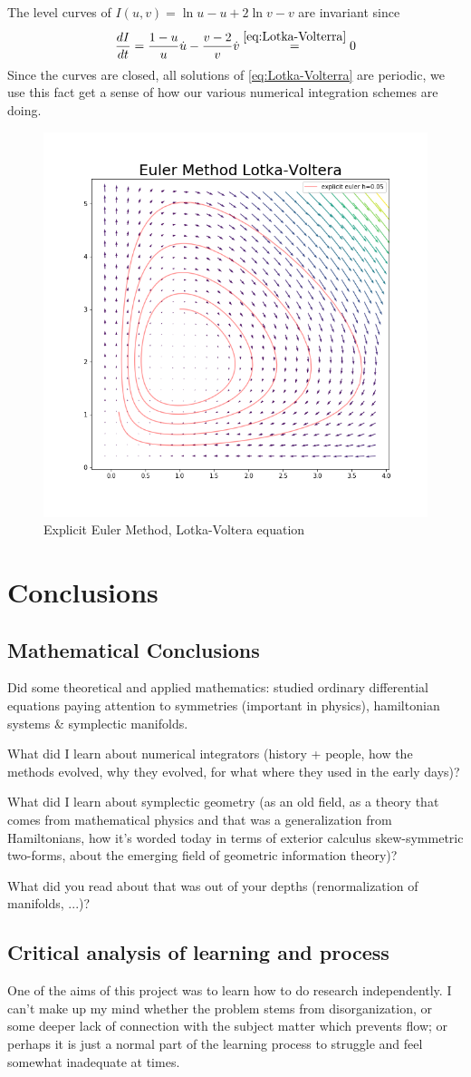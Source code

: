 \documentclass[12pt]{article}
\begin{document}
The level curves of $I(u,v) = \ln u - u + 2\ln v - v$ are invariant since 
$$
\frac{dI}{dt} = \frac{1-u}{u}\dot u - \frac{v-2}{v}\dot v \stackrel{\eqref{eq:Lotka-Volterra}}{=} 0
$$
Since the curves are closed, all solutions of \eqref{eq:Lotka-Volterra} are periodic, we use this fact get a sense of how our various numerical integration schemes are doing. 

\begin{figure}[h!]
    \centering
    \includegraphics[width=0.3\linewidth]{Figures/explicit_euler_metod_lotka_voltera.png}
    \caption{Explicit Euler Method, Lotka-Voltera equation}
    \label{fig:Explicit Euler Lotka-Voltera}
\end{figure}








\section{Conclusions}
\subsection{Mathematical Conclusions}
Did some theoretical and applied mathematics: studied ordinary differential equations paying attention to symmetries (important in physics), hamiltonian systems \& symplectic manifolds. 

What did I learn about numerical integrators (history + people, how the methods evolved, why they evolved, for what where they used in the early days)?

What did I learn about symplectic geometry (as an old field, as a theory that comes from mathematical physics and that was a generalization from Hamiltonians, how it's worded today in terms of exterior calculus skew-symmetric two-forms, about the emerging field of geometric information theory)?

What did you read about that was out of your depths (renormalization of manifolds, ...)?

\subsection{Critical analysis of learning and process}
One of the aims of this project was to learn how to do research independently. I can't make up my mind whether the problem stems from disorganization, or some deeper lack of connection with the subject matter which prevents flow; or perhaps it is just a normal part of the learning process to struggle and feel somewhat inadequate at times.
\end{document}
